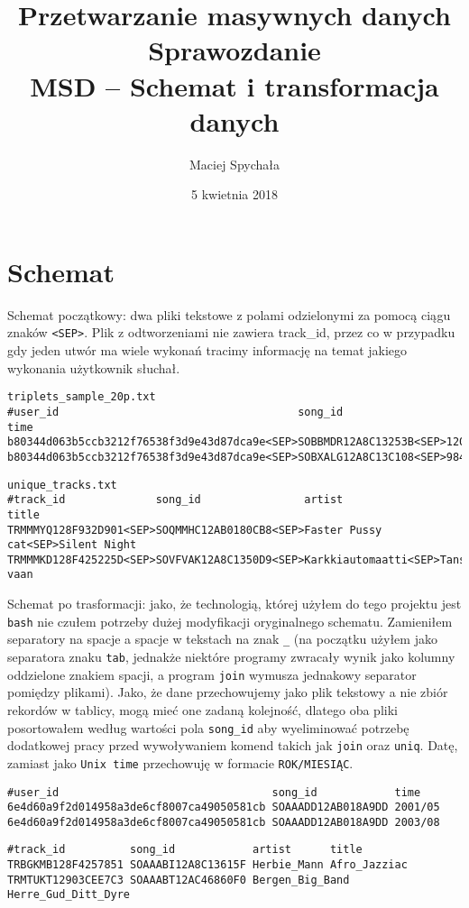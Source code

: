 \documentclass[a4paper,11pt]{article}
\author{Maciej Spychała}
\title{Przetwarzanie masywnych danych\\ 
\large{{\bf Sprawozdanie} \\ MSD -- Schemat i transformacja danych}}
\date{5 kwietnia 2018}
\begin{document}
\maketitle 

\section{Schemat}

Schemat początkowy: dwa pliki tekstowe z polami odzielonymi za pomocą ciągu znaków \texttt{<SEP>}.
Plik z odtworzeniami nie zawiera track\_id, przez co w przypadku gdy jeden utwór ma wiele wykonań tracimy informację na temat jakiego wykonania użytkownik słuchał.

\begin{footnotesize}
\begin{verbatim}
triplets_sample_20p.txt
#user_id                                     song_id                time
b80344d063b5ccb3212f76538f3d9e43d87dca9e<SEP>SOBBMDR12A8C13253B<SEP>1203083335
b80344d063b5ccb3212f76538f3d9e43d87dca9e<SEP>SOBXALG12A8C13C108<SEP>984663773
\end{verbatim}

\begin{verbatim}
unique_tracks.txt
#track_id              song_id                artist               title
TRMMMYQ128F932D901<SEP>SOQMMHC12AB0180CB8<SEP>Faster Pussy cat<SEP>Silent Night
TRMMMKD128F425225D<SEP>SOVFVAK12A8C1350D9<SEP>Karkkiautomaatti<SEP>Tanssi vaan
\end{verbatim}
\end{footnotesize}

Schemat po trasformacji: jako, że technologią, której użyłem do tego projektu jest \texttt{bash} nie czułem potrzeby dużej modyfikacji oryginalnego schematu.
Zamieniłem separatory na spacje a spacje w tekstach na znak \texttt{\_} (na początku użyłem jako separatora znaku \texttt{tab}, jednakże niektóre programy zwracały wynik jako kolumny oddzielone znakiem spacji, a program \texttt{join} wymusza jednakowy separator pomiędzy plikami).
Jako, że dane przechowujemy jako plik tekstowy a nie zbiór rekordów w tablicy, mogą mieć one zadaną kolejność, dlatego oba pliki posortowałem według wartości pola \texttt{song\_id} aby wyeliminować potrzebę dodatkowej pracy przed wywoływaniem komend takich jak \texttt{join} oraz \texttt{uniq}.
Datę, zamiast jako \texttt{Unix time} przechowuję w formacie \texttt{ROK/MIESIĄC}.

\begin{footnotesize}
\begin{verbatim}
#user_id                                 song_id            time
6e4d60a9f2d014958a3de6cf8007ca49050581cb SOAAADD12AB018A9DD 2001/05
6e4d60a9f2d014958a3de6cf8007ca49050581cb SOAAADD12AB018A9DD 2003/08
\end{verbatim}

\begin{verbatim}
#track_id          song_id            artist      title
TRBGKMB128F4257851 SOAAABI12A8C13615F Herbie_Mann Afro_Jazziac
TRMTUKT12903CEE7C3 SOAAABT12AC46860F0 Bergen_Big_Band Herre_Gud_Ditt_Dyre
\end{verbatim}
\end{footnotesize}
\end{document}
